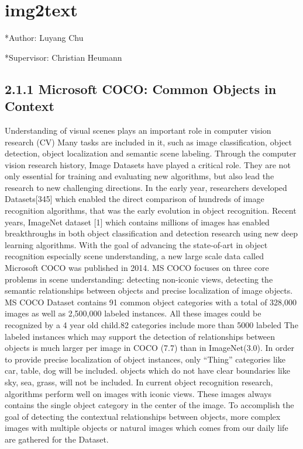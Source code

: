 \documentclass[
]{krantz}
\begin{document}
\hypertarget{img2text}{%
\section{img2text}\label{img2text}}

*Author: Luyang Chu

*Supervisor: Christian Heumann

\hypertarget{microsoft-coco-common-objects-in-context}{%
\subsection{2.1.1 Microsoft COCO: Common Objects in Context}\label{microsoft-coco-common-objects-in-context}}

Understanding of visual scenes plays an important role in computer vision research (CV)
Many tasks are included in it, such as image classification, object detection, object localization and semantic scene labeling.
Through the computer vision research history, Image Datasets have played a critical role. They are not only essential for training and evaluating new algorithms, but also lead the research to new challenging directions.\citep{mccoco} In the early year, researchers developed Datasets{[}345{]} which enabled the direct comparison of hundreds of image recognition algorithms, that was the early evolution in object recognition. Recent years, ImageNet dataset {[}1{]} which contains millions of images has enabled breakthroughs in both object classification and detection research using new deep learning algorithms.
With the goal of advancing the state-of-art in object recognition especially scene understanding, a new large scale data called Microsoft COCO was published in 2014. MS COCO focuses on three core problems in scene understanding: detecting non-iconic views, detecting the semantic relationships between objects and precise localization of image objects.\citep{mccoco}
MS COCO Dataset contains 91 common object categories with a total of 328,000 images as well as 2,500,000 labeled instances. All these images could be recognized by a 4 year old child.82 categories include more than 5000 labeled The labeled instances which may support the detection of relationships between objects is much larger per image in COCO (7.7) than in ImageNet(3.0)\citep{mccoco}. In order to provide precise localization of object instances, only ``Thing'' categories like car, table, dog will be included. objects which do not have clear boundaries like sky, sea, grass, will not be included. In current object recognition research, algorithms perform well on images with iconic views. These images always contains the single object category in the center of the image. To accomplish the goal of detecting the contextual relationships between objects, more complex images with multiple objects or natural images which comes from our daily life are gathered for the Dataset.
\end{document}

